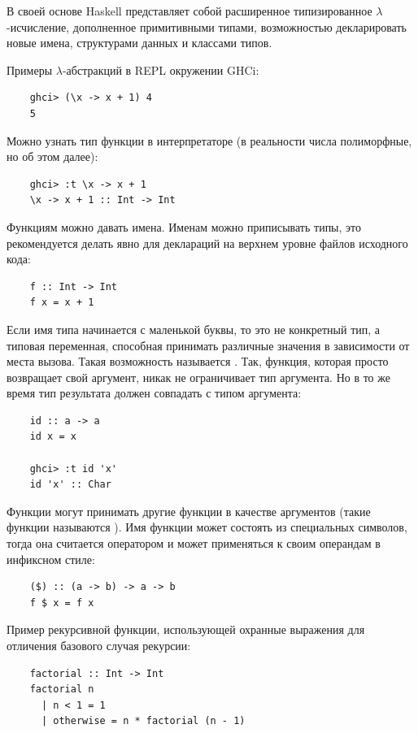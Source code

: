 В своей основе Haskell представляет собой расширенное типизированное $\lambda$-исчисление, дополненное примитивными типами, возможностью декларировать новые имена, структурами данных и классами типов.

Примеры $\lambda$-абстракций в REPL окружении GHCi:

\begin{verbatim}
    ghci> (\x -> x + 1) 4
    5
\end{verbatim}

Можно узнать тип функции в интерпретаторе (в реальности числа полиморфные, но об этом далее):
\begin{verbatim}
    ghci> :t \x -> x + 1
    \x -> x + 1 :: Int -> Int
\end{verbatim}

Функциям можно давать имена.
Именам можно приписывать типы, это рекомендуется делать явно для деклараций на верхнем уровне файлов исходного кода:
\begin{verbatim}
    f :: Int -> Int
    f x = x + 1
\end{verbatim}

Если имя типа начинается с маленькой буквы, то это не конкретный тип, а типовая переменная, способная принимать различные значения в зависимости от места вызова.
Такая возможность называется .
Так, функция, которая просто возвращает свой аргумент, никак не ограничивает тип аргумента.
Но в то же время тип результата должен совпадать с типом аргумента:
\begin{verbatim}
    id :: a -> a
    id x = x

    ghci> :t id 'x'
    id 'x' :: Char
\end{verbatim}

Функции могут принимать другие функции в качестве аргументов (такие функции называются ).
Имя функции может состоять из специальных символов, тогда она считается оператором и может применяться к своим операндам в инфиксном стиле:
\begin{verbatim}
    ($) :: (a -> b) -> a -> b
    f $ x = f x
\end{verbatim}

Пример рекурсивной функции, использующей охранные выражения для отличения базового случая рекурсии:
\begin{verbatim}
    factorial :: Int -> Int
    factorial n
      | n < 1 = 1
      | otherwise = n * factorial (n - 1)
\end{verbatim}

